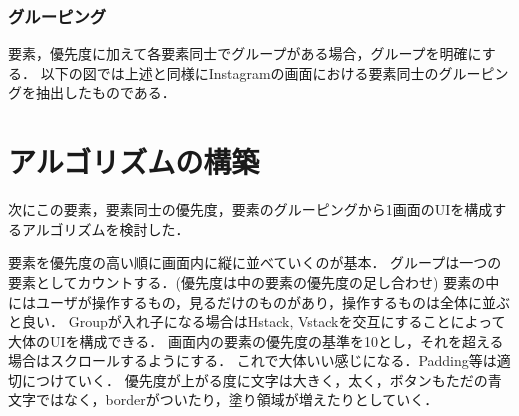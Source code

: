 \subsubsection{グルーピング}
要素，優先度に加えて各要素同士でグループがある場合，グループを明確にする．
以下の図では上述と同様にInstagramの画面における要素同士のグルーピングを抽出したものである．


\section{アルゴリズムの構築}
次にこの要素，要素同士の優先度，要素のグルーピングから1画面のUIを構成するアルゴリズムを検討した．

要素を優先度の高い順に画面内に縦に並べていくのが基本．
グループは一つの要素としてカウントする．(優先度は中の要素の優先度の足し合わせ)
要素の中にはユーザが操作するもの，見るだけのものがあり，操作するものは全体に並ぶと良い．
Groupが入れ子になる場合はHstack, Vstackを交互にすることによって大体のUIを構成できる．
画面内の要素の優先度の基準を10とし，それを超える場合はスクロールするようにする．
これで大体いい感じになる．Padding等は適切につけていく．
優先度が上がる度に文字は大きく，太く，ボタンもただの青文字ではなく，borderがついたり，塗り領域が増えたりとしていく．

